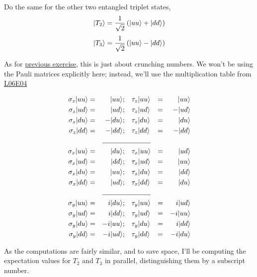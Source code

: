 \documentclass[solutions.tex]{subfiles}
\begin{document}
\maketitle
\begin{exercise} Do the same for the other two entangled triplet
states,
\[
	|T_2\rangle = \frac1{\sqrt2}\left(|uu\rangle+|dd\rangle\right)
\]
\[
	|T_3\rangle = \frac1{\sqrt2}\left(|uu\rangle-|dd\rangle\right)
\]
\end{exercise}
As for
\href{https://github.com/mbivert/ttm/blob/master/qm/L06E07.pdf}{previous exercise},
this is just about crunching numbers. We won't be using the Pauli matrices
explicitly here; instead, we'll use the multiplication table from
\href{https://github.com/mbivert/ttm/blob/master/qm/L06E04.pdf}{L06E04}

\begin{equation*}\begin{aligned}
	\sigma_z\ket{uu} &=&\ket{uu};  &&& \tau_z\ket{uu} &=&& \ket{uu} \\
	\sigma_z\ket{ud} &=&\ket{ud};  &&& \tau_z\ket{ud} &=&& -\ket{ud} \\
	\sigma_z\ket{du} &=&-\ket{du}; &&& \tau_z\ket{du} &=&& \ket{du} \\
	\sigma_z\ket{dd} &=&-\ket{dd}; &&& \tau_z\ket{dd} &=&& -\ket{dd} \\
	\cline{3-6}
	\sigma_x\ket{uu} &=&\ket{du}; &&& \tau_x\ket{uu} &=&& \ket{ud} \\
	\sigma_x\ket{ud} &=&\ket{dd}; &&& \tau_x\ket{ud} &=&& \ket{uu} \\
	\sigma_x\ket{du} &=&\ket{uu}; &&& \tau_x\ket{du} &=&& \ket{dd} \\
	\sigma_x\ket{dd} &=&\ket{ud}; &&& \tau_x\ket{dd} &=&& \ket{du} \\
	\cline{3-6}
	\sigma_y\ket{uu} &=&i\ket{du};  &&& \tau_y\ket{uu} &=&& i\ket{ud} \\
	\sigma_y\ket{ud} &=&i\ket{dd};  &&& \tau_y\ket{ud} &=&& -i\ket{uu} \\
	\sigma_y\ket{du} &=&-i\ket{uu}; &&& \tau_y\ket{du} &=&& i\ket{dd} \\
	\sigma_y\ket{dd} &=&-i\ket{ud}; &&& \tau_y\ket{dd} &=&& -i\ket{du} \\
\end{aligned}\end{equation*}

\hr

As the computations are fairly similar, and to save space, I'll be computing
the expectation values for $T_2$ and $T_3$ in parallel, distinguishing them by
a subscript number. \\
\end{document}
